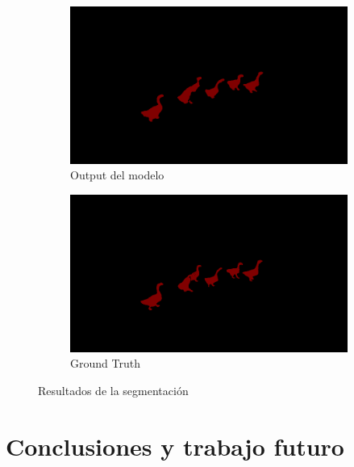 \documentclass[12pt,a4paper]{report}
\begin{document}
\begin{figure}
    \begin{subfigure}{0.45\textwidth}
        \centering
        \includegraphics[width=\textwidth]{media/data/cmx_output.png}
        \caption{Output del modelo}
    \end{subfigure}
    \hfill
    \begin{subfigure}{0.45\textwidth}
        \centering
        \includegraphics[width=\textwidth]{media/data/gueese_gt.png}
        \caption{Ground Truth}
    \end{subfigure}
    \caption{Resultados de la segmentación}
    \label{fig:segmentation-example}
\end{figure}


\chapter{Conclusiones y trabajo futuro}
\end{document}
